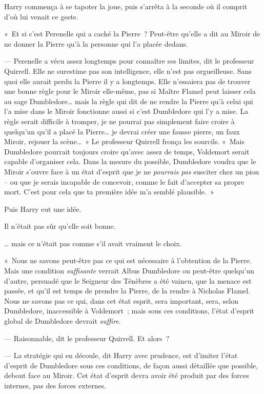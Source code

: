 Harry commença à se tapoter la joue, puis s'arrêta à la seconde où il comprit d'où lui venait ce geste.

«~Et si c'est Perenelle qui a caché la Pierre~?
Peut-être qu'elle a dit au Miroir de ne donner la Pierre qu'à la personne qui l'a placée dedans.

--- Perenelle a vécu assez longtemps pour connaître ses limites, dit le professeur Quirrell.
Elle ne surestime pas son intelligence, elle n'est pas orgueilleuse.
Sans quoi elle aurait perdu la Pierre il y a longtemps.
Elle n'essaiera pas de trouver une bonne règle pour le Miroir elle-même, pas si Maître Flamel peut laisser cela au sage Dumbledore… mais la règle qui dit de ne rendre la Pierre qu'à celui qui l'a mise dans le Miroir fonctionne aussi si c'est Dumbledore qui l'y a mise.
La règle serait difficile à tromper, je ne pourrai pas simplement faire croire à quelqu'un qu'il a placé la Pierre… je devrai créer une fausse pierre, un faux Miroir, rejouer la scène…~»
Le professeur Quirrell fronça les sourcils.
«~Mais Dumbledore pourrait toujours croire qu'avec assez de temps, Voldemort serait capable d'organiser cela.
Dans la mesure du possible, Dumbledore voudra que le Miroir s'ouvre face à un état d'esprit que je ne \emph{pourrais pas} susciter chez un pion -- ou que je serais incapable de concevoir, comme le fait d'accepter sa propre mort.
C'est pour cela que ta première idée m'a semblé plausible.~»

Puis Harry eut une idée.

Il n'était pas sûr qu'elle soit bonne.

… mais ce n'était pas comme s'il avait vraiment le choix.

«~Nous ne savons peut-être pas ce qui est nécessaire à l'obtention de la Pierre.
Mais une condition \emph{suffisante} verrait Albus Dumbledore ou peut-être quelqu'un d'autre, persuadé que le Seigneur des Ténèbres a été vaincu, que la menace est passée, et qu'il est temps de prendre la Pierre, de la rendre à Nicholas Flamel.
Nous ne savons pas ce qui, dans cet état esprit, sera important, sera, selon Dumbledore, inaccessible à Voldemort~; mais sous ces conditions, l'état d'esprit global de Dumbledore devrait \emph{suffire}.

--- Raisonnable, dit le professeur Quirrell.
Et alors~?

--- La stratégie qui en découle, dit Harry avec prudence, est d'imiter l'état d'esprit de Dumbledore sous ces conditions, de façon aussi détaillée que possible, debout face au Miroir.
Cet état d'esprit devra avoir été produit par des forces internes, pas des forces externes.

